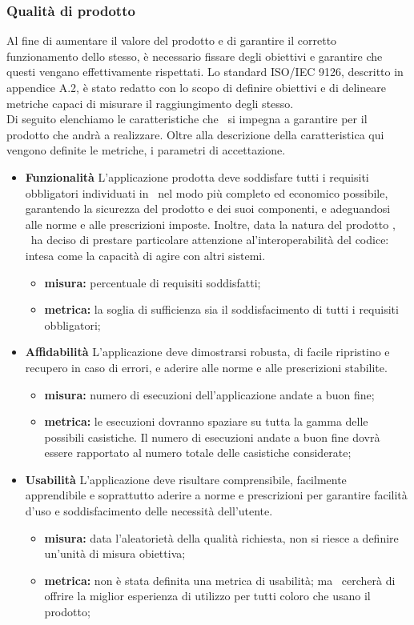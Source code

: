 \subsubsection{Qualità di prodotto}
Al fine di aumentare il valore del prodotto e di garantire il corretto funzionamento dello stesso, è necessario fissare degli obiettivi e garantire che questi vengano effettivamente rispettati.
Lo standard ISO/IEC 9126, descritto in appendice A.2, è stato redatto con lo scopo di definire obiettivi e di delineare metriche capaci di misurare il raggiungimento degli stesso.\\
Di seguito elenchiamo le caratteristiche che \gruppo ~si impegna a garantire per il prodotto che andrà a realizzare.
Oltre alla descrizione della caratteristica qui vengono definite le metriche, i parametri di accettazione. 
\begin{itemize}
\item \textbf{Funzionalità}
L’applicazione prodotta deve soddisfare tutti i requisiti obbligatori individuati in \infoAR ~nel modo più completo ed economico possibile, garantendo la sicurezza del prodotto e dei suoi componenti, e adeguandosi alle norme e alle prescrizioni imposte. Inoltre, data la natura del prodotto \progetto, \gruppo ~ha deciso di prestare particolare attenzione al'interoperabilità del codice: intesa come la capacità di agire con altri sistemi.
\begin{itemize}
\item \textbf{misura:} percentuale di requisiti soddisfatti;
\item \textbf{metrica:} la soglia di sufficienza sia il soddisfacimento di tutti i requisiti obbligatori;
\end{itemize}

\item \textbf{Affidabilità}
L’applicazione deve dimostrarsi robusta, di facile ripristino e recupero in caso di errori, e aderire alle norme e alle prescrizioni stabilite.
\begin{itemize}
\item \textbf{misura:} numero di esecuzioni dell'applicazione andate a buon fine;
\item \textbf{metrica:} le esecuzioni dovranno spaziare su tutta la gamma delle possibili casistiche. Il numero di esecuzioni andate a buon fine dovrà essere rapportato al numero totale delle casistiche considerate;
\end{itemize}

\item \textbf{Usabilità}
L’applicazione deve risultare comprensibile, facilmente apprendibile e soprattutto aderire a norme e prescrizioni per garantire facilità d’uso e soddisfacimento delle necessità dell’utente.
\begin{itemize}
\item \textbf{misura:} data l'aleatorietà della qualità richiesta, non si riesce a definire un'unità di misura obiettiva;
\item \textbf{metrica:} non è stata definita una metrica di usabilità; ma \gruppo ~cercherà di offrire la miglior esperienza di utilizzo per tutti coloro che usano il prodotto;
\end{itemize}


\end{itemize}
